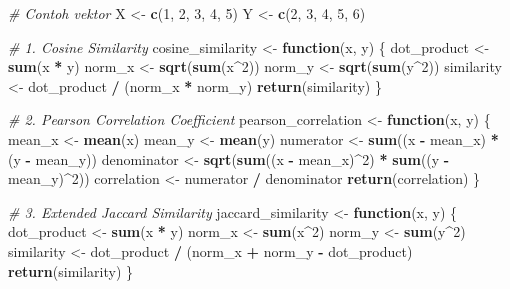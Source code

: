 \documentclass[
  oneside]{book}
\newenvironment{Shaded}{\begin{snugshade}}{\end{snugshade}}
\newcommand{\CommentTok}[1]{\textcolor[rgb]{0.56,0.35,0.01}{\textit{#1}}}
\newcommand{\ControlFlowTok}[1]{\textcolor[rgb]{0.13,0.29,0.53}{\textbf{#1}}}
\newcommand{\DecValTok}[1]{\textcolor[rgb]{0.00,0.00,0.81}{#1}}
\newcommand{\FunctionTok}[1]{\textcolor[rgb]{0.13,0.29,0.53}{\textbf{#1}}}
\newcommand{\NormalTok}[1]{#1}
\newcommand{\OtherTok}[1]{\textcolor[rgb]{0.56,0.35,0.01}{#1}}
\newcommand{\SpecialCharTok}[1]{\textcolor[rgb]{0.81,0.36,0.00}{\textbf{#1}}}
\begin{document}
\begin{Shaded}
\begin{Highlighting}[]
\CommentTok{\# Contoh vektor}
\NormalTok{X }\OtherTok{\textless{}{-}} \FunctionTok{c}\NormalTok{(}\DecValTok{1}\NormalTok{, }\DecValTok{2}\NormalTok{, }\DecValTok{3}\NormalTok{, }\DecValTok{4}\NormalTok{, }\DecValTok{5}\NormalTok{)}
\NormalTok{Y }\OtherTok{\textless{}{-}} \FunctionTok{c}\NormalTok{(}\DecValTok{2}\NormalTok{, }\DecValTok{3}\NormalTok{, }\DecValTok{4}\NormalTok{, }\DecValTok{5}\NormalTok{, }\DecValTok{6}\NormalTok{)}

\CommentTok{\# 1. Cosine Similarity}
\NormalTok{cosine\_similarity }\OtherTok{\textless{}{-}} \ControlFlowTok{function}\NormalTok{(x, y) \{}
\NormalTok{  dot\_product }\OtherTok{\textless{}{-}} \FunctionTok{sum}\NormalTok{(x }\SpecialCharTok{*}\NormalTok{ y)}
\NormalTok{  norm\_x }\OtherTok{\textless{}{-}} \FunctionTok{sqrt}\NormalTok{(}\FunctionTok{sum}\NormalTok{(x}\SpecialCharTok{\^{}}\DecValTok{2}\NormalTok{))}
\NormalTok{  norm\_y }\OtherTok{\textless{}{-}} \FunctionTok{sqrt}\NormalTok{(}\FunctionTok{sum}\NormalTok{(y}\SpecialCharTok{\^{}}\DecValTok{2}\NormalTok{))}
\NormalTok{  similarity }\OtherTok{\textless{}{-}}\NormalTok{ dot\_product }\SpecialCharTok{/}\NormalTok{ (norm\_x }\SpecialCharTok{*}\NormalTok{ norm\_y)}
  \FunctionTok{return}\NormalTok{(similarity)}
\NormalTok{\}}

\CommentTok{\# 2. Pearson Correlation Coefficient}
\NormalTok{pearson\_correlation }\OtherTok{\textless{}{-}} \ControlFlowTok{function}\NormalTok{(x, y) \{}
\NormalTok{  mean\_x }\OtherTok{\textless{}{-}} \FunctionTok{mean}\NormalTok{(x)}
\NormalTok{  mean\_y }\OtherTok{\textless{}{-}} \FunctionTok{mean}\NormalTok{(y)}
\NormalTok{  numerator }\OtherTok{\textless{}{-}} \FunctionTok{sum}\NormalTok{((x }\SpecialCharTok{{-}}\NormalTok{ mean\_x) }\SpecialCharTok{*}\NormalTok{ (y }\SpecialCharTok{{-}}\NormalTok{ mean\_y))}
\NormalTok{  denominator }\OtherTok{\textless{}{-}} \FunctionTok{sqrt}\NormalTok{(}\FunctionTok{sum}\NormalTok{((x }\SpecialCharTok{{-}}\NormalTok{ mean\_x)}\SpecialCharTok{\^{}}\DecValTok{2}\NormalTok{) }\SpecialCharTok{*} \FunctionTok{sum}\NormalTok{((y }\SpecialCharTok{{-}}\NormalTok{ mean\_y)}\SpecialCharTok{\^{}}\DecValTok{2}\NormalTok{))}
\NormalTok{  correlation }\OtherTok{\textless{}{-}}\NormalTok{ numerator }\SpecialCharTok{/}\NormalTok{ denominator}
  \FunctionTok{return}\NormalTok{(correlation)}
\NormalTok{\}}

\CommentTok{\# 3. Extended Jaccard Similarity}
\NormalTok{jaccard\_similarity }\OtherTok{\textless{}{-}} \ControlFlowTok{function}\NormalTok{(x, y) \{}
\NormalTok{  dot\_product }\OtherTok{\textless{}{-}} \FunctionTok{sum}\NormalTok{(x }\SpecialCharTok{*}\NormalTok{ y)}
\NormalTok{  norm\_x }\OtherTok{\textless{}{-}} \FunctionTok{sum}\NormalTok{(x}\SpecialCharTok{\^{}}\DecValTok{2}\NormalTok{)}
\NormalTok{  norm\_y }\OtherTok{\textless{}{-}} \FunctionTok{sum}\NormalTok{(y}\SpecialCharTok{\^{}}\DecValTok{2}\NormalTok{)}
\NormalTok{  similarity }\OtherTok{\textless{}{-}}\NormalTok{ dot\_product }\SpecialCharTok{/}\NormalTok{ (norm\_x }\SpecialCharTok{+}\NormalTok{ norm\_y }\SpecialCharTok{{-}}\NormalTok{ dot\_product)}
  \FunctionTok{return}\NormalTok{(similarity)}
\NormalTok{\}}


\end{Highlighting}
\end{Shaded}
\end{document}
